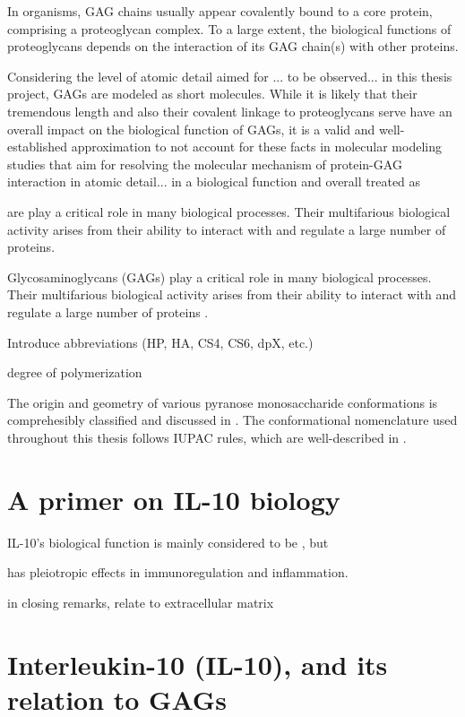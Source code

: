In organisms, GAG chains usually
appear covalently bound to a core protein, comprising a proteoglycan complex.
To a large extent, the biological functions of proteoglycans depends on the
interaction of its GAG chain(s) with other proteins.



Considering the level of atomic detail aimed for ... to be observed... in this
thesis project, GAGs are modeled as short molecules. While it is likely
that their tremendous length and also their covalent linkage to proteoglycans
serve have an overall impact on the biological function of GAGs, it is a
valid and well-established approximation to not account for these facts in
molecular modeling studies that aim for resolving the molecular mechanism of
protein-GAG interaction in atomic detail... in a biological function and overall  treated as


are play a critical role in many biological processes.
Their multifarious biological activity arises from their ability to interact
with and regulate a large number of proteins.


Glycosaminoglycans (GAGs) play a critical role in many biological processes.
Their multifarious biological activity arises from their ability to interact
with and regulate a large number of proteins \cite{handel_2005}.

Introduce abbreviations (HP, HA, CS4, CS6, dpX, etc.)


degree of polymerization


The origin and geometry of various pyranose monosaccharide conformations is
comprehesibly classified and discussed in
\cite{classification_pyranose_conformers_1960}. The conformational nomenclature
used throughout this thesis follows IUPAC rules, which are well-described in
\cite{iupac_gag_conformations_1980}.


\section{A primer on IL-10 biology}

 IL-10's biological function is mainly considered to be
, but

 has pleiotropic effects in immunoregulation and
inflammation.


        in closing remarks, relate to extracellular matrix


\section{Interleukin-10 (IL-10), and its relation to GAGs}



